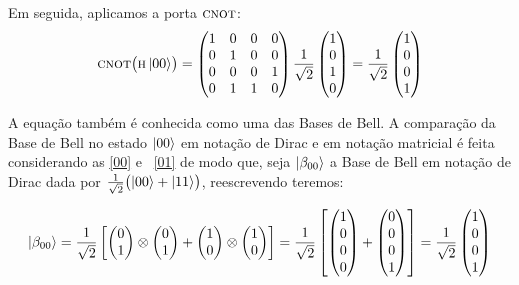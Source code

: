 Em seguida, aplicamos a porta \(\operatorname{\textsc{cnot}}\):
\begin{equation}
  \operatorname{\textsc{cnot}} \bigl( \operatorname{\textsc{h}} \ket{00} \bigr) =
\begin{pmatrix}
1 & 0 & 0 & 0 \\
0 & 1 & 0 & 0 \\
0 & 0 & 0 & 1 \\
0 & 1 & 1 & 0
\end{pmatrix}
\frac{1}{\sqrt{2}}\begin{pmatrix}
1 \\
0 \\
1 \\
0
\end{pmatrix} = \frac{1}{\sqrt{2}} \begin{pmatrix}
1 \\
0 \\
0 \\
1
\end{pmatrix}
\end{equation}

A equação também é conhecida como uma das Bases de Bell. A comparação da Base de Bell no estado $\ket{00}$ em notação de Dirac e em notação matricial é feita considerando as \eqref{00} e ~\eqref{01} de modo que, seja \(\ket{\beta_{00}}\) a Base de Bell em notação de Dirac dada por \(\frac{1}{\sqrt{2}} \bigl(\ket{00} + \ket{11}\bigr)\), reescrevendo teremos:

\begin{equation}\label{comparacaobeta}
\ket{\beta_{00}} = \frac{1}{\sqrt{2}} \left[ \begin{pmatrix}
0 \\
1
\end{pmatrix} \otimes \begin{pmatrix}
0 \\
1
\end{pmatrix} + \begin{pmatrix}
1 \\
0
\end{pmatrix} \otimes \begin{pmatrix}
1 \\
0
\end{pmatrix}\right] = \frac{1}{\sqrt{2}} \left[ \begin{pmatrix}
1 \\
0 \\
0 \\
0 
\end{pmatrix} + \begin{pmatrix}
0 \\
0 \\
0 \\
1 
\end{pmatrix}\right] = \frac{1}{\sqrt{2}} \begin{pmatrix}
1 \\
0 \\
0 \\
1 
\end{pmatrix}
\end{equation}

